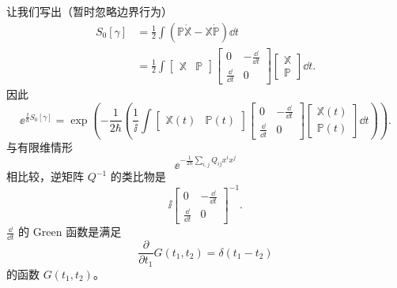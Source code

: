 
让我们写出（暂时忽略边界行为）
\[
  \begin{aligned}
    S_0[\gamma]
    &=\frac{1}{2}\int\left(\mathbb{P}\dot{\mathbb{X}}-\mathbb{X}\dot{\mathbb{P}}\right)\dd t\\
    &=\frac{1}{2}\int
      \begin{bmatrix}\mathbb{X}&\mathbb{P}\end{bmatrix}
      \begin{bmatrix}0&-\frac{\dd}{\dd t}\\[2pt]\frac{\dd}{\dd t}&0\end{bmatrix}
      \begin{bmatrix}\mathbb{X}\\[2pt]\mathbb{P}\end{bmatrix}\dd t.
  \end{aligned}
\]
因此
\[
  \ee^{\frac{\ii}{\hbar}S_0[\gamma]}
  =\exp\left(-\frac{1}{2\hbar}\left(
    \frac{1}{\ii}\int
    \begin{bmatrix}\mathbb{X}(t)&\mathbb{P}(t)\end{bmatrix}
    \begin{bmatrix}0&-\frac{\dd}{\dd t}\\[2pt]\frac{\dd}{\dd t}&0\end{bmatrix}
    \begin{bmatrix}\mathbb{X}(t)\\[2pt]\mathbb{P}(t)\end{bmatrix}\dd t
  \right)\right).
\]
与有限维情形
\[
  \ee^{-\frac{1}{2\hbar}\sum_{i,j}Q_{ij}x^ix^j}
\]
相比较，逆矩阵 $Q^{-1}$ 的类比物是
\[
  \ii
  \begin{bmatrix}0&-\frac{\dd}{\dd t}\\[2pt]\frac{\dd}{\dd t}&0\end{bmatrix}^{-1}.
\]
$\frac{\dd}{\dd t}$ 的 Green 函数是满足
\[
  \frac{\partial}{\partial t_1}G(t_1,t_2)=\delta(t_1-t_2)
\]
的函数 $G(t_1,t_2)$。


